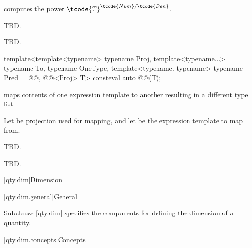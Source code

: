\begin{itemdescr}
\pnum
{} computes the power $\tcode{T}^{\tcode{Num}/\tcode{Den}}$.

\pnum
\effects
TBD.

\pnum
\returns
TBD.
\end{itemdescr}

\begin{itemdecl}
template<template<typename> typename Proj, template<typename...> typename To, typename OneType,
         template<typename, typename> typename Pred = @@, @@<Proj> T>
consteval auto @@(T);
\end{itemdecl}

\begin{itemdescr}
\pnum
{} maps contents of one expression template to another resulting in a different type list.

\pnum
Let  be projection used for mapping, and
let  be the expression template to map from.

\pnum
\effects
TBD.

\pnum
\returns
TBD.
\end{itemdescr}

[qty.dim]{Dimension}

[qty.dim.general]{General}

\pnum
Subclause \ref{qty.dim} specifies the components
for defining the dimension of a quantity.

[qty.dim.concepts]{Concepts}

